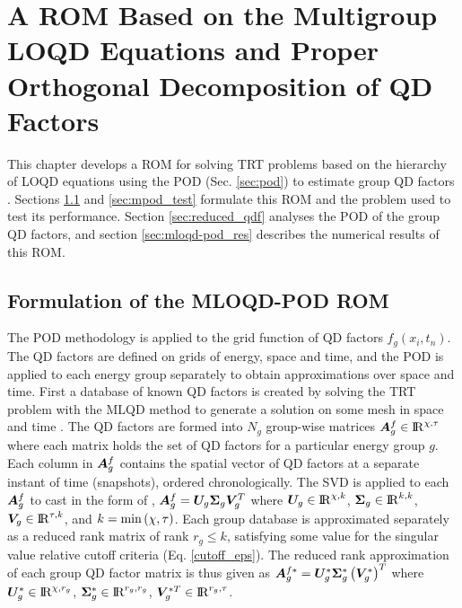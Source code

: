 \chapter{A ROM Based on the Multigroup LOQD Equations and Proper Orthogonal Decomposition of QD Factors}
\label{chap-three}

This chapter develops a ROM for solving TRT problems based on the hierarchy of LOQD equations using the POD (Sec. \ref{sec:pod}) to estimate group QD factors \cite{jc-dya-m&c2019}. Sections \ref{sec:pod-qd} and \ref{sec:mpod_test} formulate this ROM and the problem used to test its performance. Section \ref{sec:reduced_qdf} analyses the POD of the group QD factors, and section \ref{sec:mloqd-pod_res} describes the numerical results of this ROM.

\section{Formulation of the MLOQD-POD ROM} \label{sec:pod-qd} 
	The POD methodology is applied to the grid function of QD factors $f_g(x_i,t_n)$. The QD factors are defined on grids of energy, space and time, and the POD is applied to each energy group separately to obtain approximations over space and time. First a database of known QD factors is created by solving the TRT problem with the MLQD method to generate a solution on some mesh in space and time \cite{dya-jcp-2019,dya-aristova-vya-mm1996,PASE-1986}. The QD factors are formed into $N_g$ group-wise matrices $\bm{A}^{f}_g \in {\rm I\!R}^{\chi,\tau}$ where each matrix holds the set of QD factors for a particular energy group $g$. Each column in $\bm{A}^f_g$ contains the spatial vector of QD factors at a separate instant of time (snapshots), ordered chronologically. The SVD  is applied to each $\bm{A}^f_g$ to cast in the form of , $\bm{A}^f_g = \bm{U}_g\bm{\Sigma}_g\bm{V}_g^T$ where $\bm{U}_g \in {\rm I\!R}^{\chi,k}$, $\bm{\Sigma}_g \in {\rm I\!R}^{k,k}$, $\bm{V}_g \in {\rm I\!R}^{\tau,k}$, and $k = \min\left(\chi,\tau\right)$. Each group database is approximated separately as a reduced rank matrix of rank $r_g \leq k$, satisfying some value for the singular value relative cutoff criteria (Eq. \ref{cutoff_eps}). The reduced rank approximation of each group QD factor matrix is thus given as $\bm{A}^{f*}_g  = \bm{U}_g^*\bm{\Sigma}_g^*\left(\bm{V}^{*}_g\right)^T $ where $\bm{U}_g^* \in {\rm I\!R}^{\chi,r_g}$, $\bm{\Sigma}_g^* \in {\rm I\!R}^{r_g,r_g}$, $\bm{V}_g^{*T} \in {\rm I\!R}^{r_g,\tau}$.
	
